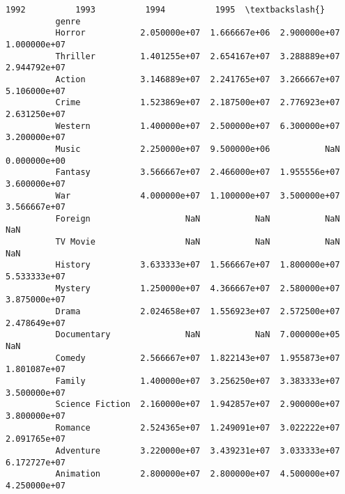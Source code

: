 \documentclass[11pt]{article}
\begin{document}
\begin{Verbatim}[commandchars=\\\{\}]
                                   1992          1993          1994          1995  \textbackslash{}
          genre                                                                     
          Horror           2.050000e+07  1.666667e+06  2.900000e+07  1.000000e+07   
          Thriller         1.401255e+07  2.654167e+07  3.288889e+07  2.944792e+07   
          Action           3.146889e+07  2.241765e+07  3.266667e+07  5.106000e+07   
          Crime            1.523869e+07  2.187500e+07  2.776923e+07  2.631250e+07   
          Western          1.400000e+07  2.500000e+07  6.300000e+07  3.200000e+07   
          Music            2.250000e+07  9.500000e+06           NaN  0.000000e+00   
          Fantasy          3.566667e+07  2.466000e+07  1.955556e+07  3.600000e+07   
          War              4.000000e+07  1.100000e+07  3.500000e+07  3.566667e+07   
          Foreign                   NaN           NaN           NaN           NaN   
          TV Movie                  NaN           NaN           NaN           NaN   
          History          3.633333e+07  1.566667e+07  1.800000e+07  5.533333e+07   
          Mystery          1.250000e+07  4.366667e+07  2.580000e+07  3.875000e+07   
          Drama            2.024658e+07  1.556923e+07  2.572500e+07  2.478649e+07   
          Documentary               NaN           NaN  7.000000e+05           NaN   
          Comedy           2.566667e+07  1.822143e+07  1.955873e+07  1.801087e+07   
          Family           1.400000e+07  3.256250e+07  3.383333e+07  3.500000e+07   
          Science Fiction  2.160000e+07  1.942857e+07  2.900000e+07  3.800000e+07   
          Romance          2.524365e+07  1.249091e+07  3.022222e+07  2.091765e+07   
          Adventure        3.220000e+07  3.439231e+07  3.033333e+07  6.172727e+07   
          Animation        2.800000e+07  2.800000e+07  4.500000e+07  4.250000e+07   
          

\end{Verbatim}
\end{document}
